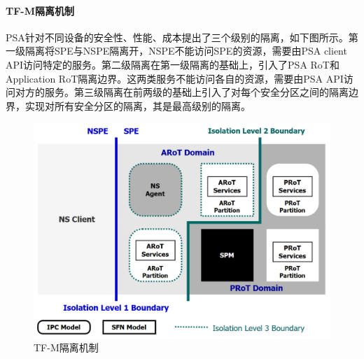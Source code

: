 \documentclass[12pt,a4paper]{ctexart}
\begin{document}
\paragraph{TF-M隔离机制}PSA针对不同设备的安全性、性能、成本提出了三个级别的隔离，如下图所示。第一级隔离将SPE与NSPE隔离开，NSPE不能访问SPE的资源，需要由PSA client API访问特定的服务。第二级隔离在第一级隔离的基础上，引入了PSA RoT和Application RoT隔离边界。这两类服务不能访问各自的资源，需要由PSA API访问对方的服务。第三级隔离在前两级的基础上引入了对每个安全分区之间的隔离边界，实现对所有安全分区的隔离，其是最高级别的隔离。
\begin{figure}
    \centering
    \includegraphics[scale=0.27]{graph/isolation.png}
    \caption{TF-M隔离机制}
\end{figure}
\end{document}
